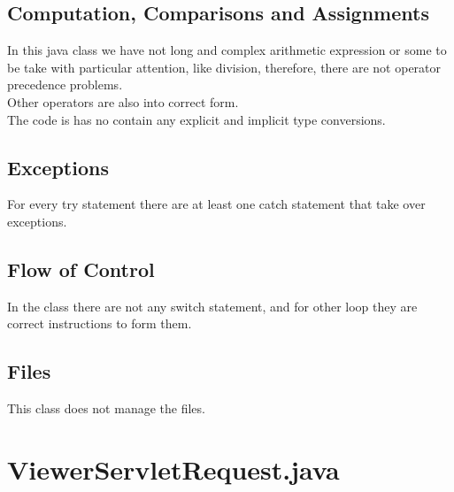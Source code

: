 \documentclass{article}
\begin{document}
\subsection{Computation, Comparisons and Assignments}
In this java class we have not long and complex arithmetic expression or some to be take with particular attention, like division, therefore, there are not operator precedence problems.\\
Other operators are also into correct form.\\
The code is has no contain any explicit and implicit type conversions.
\subsection{Exceptions}
For every try statement there are at least one catch statement that take over exceptions.
\subsection{Flow of Control}
In the class there are not any switch statement, and for other loop they are correct instructions to form them. 
\subsection{Files}
This class does not manage the files.
\newpage

\section{ViewerServletRequest.java}
\end{document}
